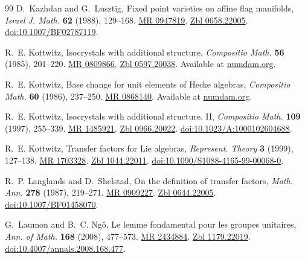 \documentclass[12pt,a4paper,oneside,english,leqno]{smfart}
\numberwithin{equation}{subsection}
\numberwithin{theo}{subsection}
\theoremstyle{plain}
\theoremstyle{definition}
\theoremstyle{remark}
\begin{document}
\begin{thebibliography}{99}
 D.~Kazhdan and G.~Lusztig, Fixed point varieties on affine flag manifolds, \emph{Israel J. Math.} \textbf{62} (1988), 129--168. \href{https://mathscinet.ams.org/mathscinet-getitem?mr=0947819}{MR 0947819}. \href{https://zbmath.org/?q=an:0658.22005}{Zbl 0658.22005}. \href{https://doi.org/10.1007/BF02787119}{doi:10.1007/BF02787119}.

 R.~E. Kottwitz, Isocrystals with additional structure, \emph{Compositio Math.} \textbf{56} (1985), 201--220. \href{https://mathscinet.ams.org/mathscinet-getitem?mr=0809866}{MR 0809866}. \href{https://zbmath.org/?q=an:0597.20038}{Zbl 0597.20038}. Available at \href{http://www.numdam.org/item?id=CM_1985__56_2_201_0}{numdam.org}.

 R.~E. Kottwitz, Base change for unit elements of Hecke algebras, \emph{Compositio Math.} \textbf{60} (1986), 237--250. \href{https://mathscinet.ams.org/mathscinet-getitem?mr=0868140}{MR 0868140}. Available at \href{http://www.numdam.org/item?id=CM_1986__60_2_237_0}{numdam.org}.

 R.~E. Kottwitz, Isocrystals with additional structure. II, \emph{Compositio Math.} \textbf{109} (1997), 255--339. \href{https://mathscinet.ams.org/mathscinet-getitem?mr=1485921}{MR 1485921}. \href{https://zbmath.org/?q=an:0966.20022}{Zbl 0966.20022}. \href{https://doi.org/10.1023/A:1000102604688}{doi:10.1023/A:1000102604688}.

 R.~E. Kottwitz, Transfer factors for Lie algebras, \emph{Represent. Theory} \textbf{3} (1999), 127--138. \href{https://mathscinet.ams.org/mathscinet-getitem?mr=1703328}{MR 1703328}. \href{https://zbmath.org/?q=an:1044.22011}{Zbl 1044.22011}. \href{https://doi.org/10.1090/S1088-4165-99-00068-0}{doi:10.1090/S1088-4165-99-00068-0}.

 R.~P. Langlands and D.~Shelstad, On the definition of transfer factors, \emph{Math. Ann.} \textbf{278} (1987), 219--271. \href{https://mathscinet.ams.org/mathscinet-getitem?mr=0909227}{MR 0909227}. \href{https://zbmath.org/?q=an:0644.22005}{Zbl 0644.22005}. \href{https://doi.org/10.1007/BF01458070}{doi:10.1007/BF01458070}.

 G.~Laumon and B.~C. Ng\^o, Le lemme fondamental pour les groupes unitaires, \emph{Ann. of Math.} \textbf{168} (2008), 477--573. \href{https://mathscinet.ams.org/mathscinet-getitem?mr=2434884}{MR 2434884}. \href{https://zbmath.org/?q=an:1179.22019}{Zbl 1179.22019}. \href{https://doi.org/10.4007/annals.2008.168.477}{doi:10.4007/annals.2008.168.477}.


\end{thebibliography}
\end{document}
